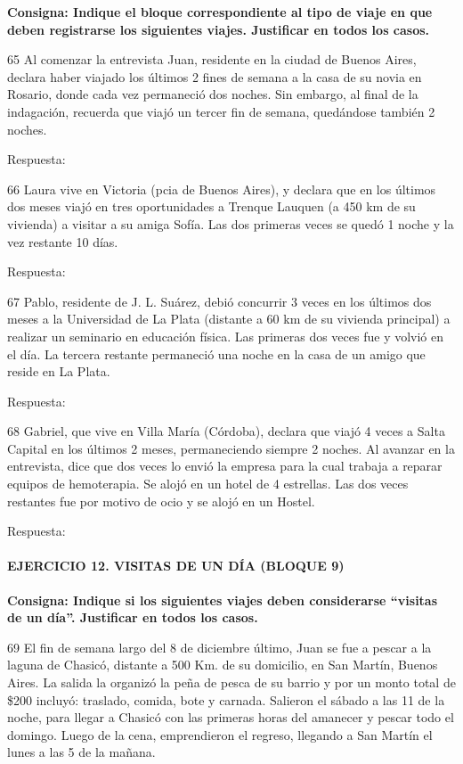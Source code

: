 \documentclass[
  openany]{book}
\begin{document}
\textbf{Consigna: Indique el bloque correspondiente al tipo de viaje en que deben registrarse los siguientes viajes. Justificar en todos los casos.}

65 Al comenzar la entrevista Juan, residente en la ciudad de Buenos Aires, declara haber viajado los últimos 2 fines de semana a la casa de su novia en Rosario, donde cada vez permaneció dos noches. Sin embargo, al final de la indagación, recuerda que viajó un tercer fin de semana, quedándose también 2 noches.

Respuesta:

66 Laura vive en Victoria (pcia de Buenos Aires), y declara que en los últimos dos meses viajó en tres oportunidades a Trenque Lauquen (a 450 km de su vivienda) a visitar a su amiga Sofía. Las dos primeras veces se quedó 1 noche y la vez restante 10 días.

Respuesta:

67 Pablo, residente de J. L. Suárez, debió concurrir 3 veces en los últimos dos meses a la Universidad de La Plata (distante a 60 km de su vivienda principal) a realizar un seminario en educación física. Las primeras dos veces fue y volvió en el día. La tercera restante permaneció una noche en la casa de un amigo que reside en La Plata.

Respuesta:

68 Gabriel, que vive en Villa María (Córdoba), declara que viajó 4 veces a Salta Capital en los últimos 2 meses, permaneciendo siempre 2 noches. Al avanzar en la entrevista, dice que dos veces lo envió la empresa para la cual trabaja a reparar equipos de hemoterapia. Se alojó en un hotel de 4 estrellas. Las dos veces restantes fue por motivo de ocio y se alojó en un Hostel.

Respuesta:

\hypertarget{ejercicio-12.-visitas-de-un-duxeda-bloque-9}{%
\paragraph{\texorpdfstring{\textbf{EJERCICIO 12. VISITAS DE UN DÍA (BLOQUE 9)}}{EJERCICIO 12. VISITAS DE UN DÍA (BLOQUE 9)}}\label{ejercicio-12.-visitas-de-un-duxeda-bloque-9}}

\textbf{Consigna: Indique si los siguientes viajes deben considerarse ``visitas de un día''. Justificar en todos los casos.}

69 El fin de semana largo del 8 de diciembre último, Juan se fue a pescar a la laguna de Chasicó, distante a 500 Km. de su domicilio, en San Martín, Buenos Aires. La salida la organizó la peña de pesca de su barrio y por un monto total de \$200 incluyó: traslado, comida, bote y carnada. Salieron el sábado a las 11 de la noche, para llegar a Chasicó con las primeras horas del amanecer y pescar todo el domingo. Luego de la cena, emprendieron el regreso, llegando a San Martín el lunes a las 5 de la mañana.
\end{document}
